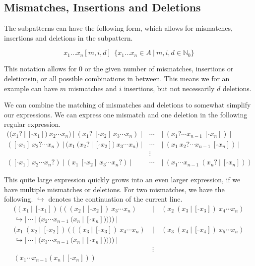 \documentclass[12pt]{article}
\begin{document}
\subsection{Mismatches, Insertions and Deletions}

The subpatterns can have the following form, which allows for mismatches, insertions and deletions in the subpattern. 

\begin{equation}
	x_1 \ldots x_n[m, i, d] \ \ \{ x_1 \ldots x_n \in A \ | \ m, i, d \in \mathbb{N}_0 \}
\end{equation} 

This notation allows for 0 or the given number of mismatches, insertions or deletionsin, or all possible combinations in between. This means we for an example can have $m$ mismatches and $i$ insertions, but not necessarily $d$ deletions.

We can combine the matching of mismatches and deletions to somewhat simplify our expressions.
We can express one mismatch and one deletion in the following regular expression.
\begin{eqnarray}
	((x_1?\ |\ [\ \hat{}x_1]) \ x_2 \cdots x_n) \ | \ (x_1? \ [\ \hat{}x_2] \ x_3 \cdots x_n) \ | \ & \cdots & \ | \ (x_1? \cdots x_{n-1} \ [\ \hat{}x_n]) \ | \\
	([\ \hat{}x_1] \ x_2? \cdots x_n) \ | \ (x_1 \ (x_2?\ |\ [\ \hat{}x_2]) \ x_3 \cdots x_n) \ | \ & \cdots & \ | \ (x_1 \ x_2? \cdots x_{n-1} \ [\ \hat{}x_n]) \ | \nonumber \\
	& \vdots & \nonumber \\
	([\ \hat{}x_1] \ x_2 \cdots x_n?) \ | \ (x_1 \ [\ \hat{}x_2] \ x_3 \cdots x_n?) \ | \ & \cdots & \ | \ (x_1 \cdots x_{n-1} \ (x_n?\ |\ [\ \hat{}x_n])) \nonumber
\end{eqnarray}

This quite large expression quickly grows into an even larger expression, if we have multiple mismatches or deletions. For two mismatches, we have the following. $\hookrightarrow$ denotes the continuation of the current line.
\begin{eqnarray}
	((x_1\ |\ [\ \hat{}x_1])\ (((x_2\ |\ [\ \hat{}x_2])\ x_3 \cdots x_n)\ &|&\ (x_2\ (x_3\ |\ [\ \hat{}x_3])\ x_4 \cdots x_n)\\
	\hookrightarrow |\ \cdots\ |\ (x_2\cdots x_{n-1}\ (x_n\ |\ [\ \hat{}x_n]))))\ | \nonumber \\
	 (x_1\ (x_2\ |\ [\ \hat{}x_2])\ (((x_3\ |\ [\ \hat{}x_3])\ x_4 \cdots x_n)\ &|&\ (x_3\ (x_4\ |\ [\ \hat{}x_4])\ x_5 \cdots x_n) \nonumber \\
	 \hookrightarrow |\ \cdots\ |\ (x_3 \cdots x_{n-1}\ (x_n\ |\ [\ \hat{}x_n]))))\ | \nonumber \\
	 & \vdots & \nonumber \\
	 (x_1\cdots x_{n-1}(x_n\ |\ [\ \hat{}x_n])) \nonumber
\end{eqnarray}
\end{document}
